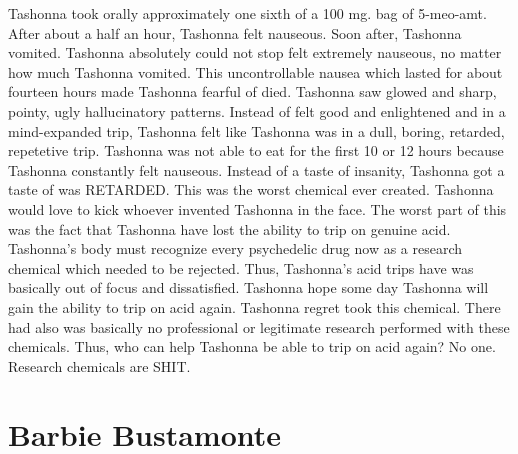 \documentclass[12pt]{book}
\begin{document}
Tashonna took orally approximately one sixth of a 100 mg. bag of 5-meo-amt. After about a half an hour, Tashonna felt nauseous. Soon after, Tashonna vomited. Tashonna absolutely could not stop felt extremely nauseous, no matter how much Tashonna vomited. This uncontrollable nausea which lasted for about fourteen hours made Tashonna fearful of died. Tashonna saw glowed and sharp, pointy, ugly hallucinatory patterns. Instead of felt good and enlightened and in a mind-expanded trip, Tashonna felt like Tashonna was in a dull, boring, retarded, repetetive trip. Tashonna was not able to eat for the first 10 or 12 hours because Tashonna constantly felt nauseous. Instead of a taste of insanity, Tashonna got a taste of was RETARDED. This was the worst chemical ever created. Tashonna would love to kick whoever invented Tashonna in the face. The worst part of this was the fact that Tashonna have lost the ability to trip on genuine acid. Tashonna's body must recognize every psychedelic drug now as a research chemical which needed to be rejected. Thus, Tashonna's acid trips have was basically out of focus and dissatisfied. Tashonna hope some day Tashonna will gain the ability to trip on acid again. Tashonna regret took this chemical. There had also was basically no professional or legitimate research performed with these chemicals. Thus, who can help Tashonna be able to trip on acid again? No one. Research chemicals are SHIT.



\chapter{Barbie Bustamonte}
\end{document}
